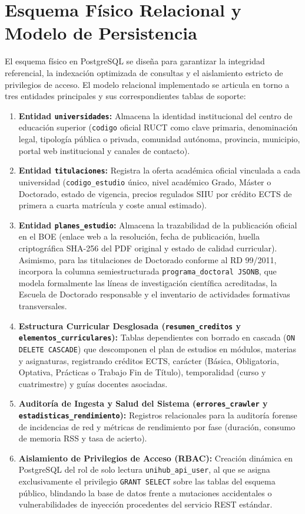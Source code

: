 \section{Esquema Físico Relacional y Modelo de Persistencia}
El esquema físico en PostgreSQL se diseña para garantizar la integridad referencial, la indexación optimizada de consultas y el aislamiento estricto de privilegios de acceso. El modelo relacional implementado se articula en torno a tres entidades principales y sus correspondientes tablas de soporte:
\begin{enumerate}
    \item \textbf{Entidad \texttt{universidades}:} Almacena la identidad institucional del centro de educación superior (\texttt{codigo} oficial RUCT como clave primaria, denominación legal, tipología pública o privada, comunidad autónoma, provincia, municipio, portal web institucional y canales de contacto).
    \item \textbf{Entidad \texttt{titulaciones}:} Registra la oferta académica oficial vinculada a cada universidad (\texttt{codigo\_estudio} único, nivel académico Grado, Máster o Doctorado, estado de vigencia, precios regulados SIIU por crédito ECTS de primera a cuarta matrícula y coste anual estimado).
    \item \textbf{Entidad \texttt{planes\_estudio}:} Almacena la trazabilidad de la publicación oficial en el BOE (enlace web a la resolución, fecha de publicación, huella criptográfica SHA-256 del PDF original y estado de calidad curricular). Asimismo, para las titulaciones de Doctorado conforme al RD 99/2011, incorpora la columna semiestructurada \texttt{programa\_doctoral JSONB}, que modela formalmente las líneas de investigación científica acreditadas, la Escuela de Doctorado responsable y el inventario de actividades formativas transversales.
    \item \textbf{Estructura Curricular Desglosada (\texttt{resumen\_creditos} y \texttt{elementos\_curriculares}):} Tablas dependientes con borrado en cascada (\texttt{ON DELETE CASCADE}) que descomponen el plan de estudios en módulos, materias y asignaturas, registrando créditos ECTS, carácter (Básica, Obligatoria, Optativa, Prácticas o Trabajo Fin de Título), temporalidad (curso y cuatrimestre) y guías docentes asociadas.
    \item \textbf{Auditoría de Ingesta y Salud del Sistema (\texttt{errores\_crawler} y \texttt{estadisticas\_rendimiento}):} Registros relacionales para la auditoría forense de incidencias de red y métricas de rendimiento por fase (duración, consumo de memoria RSS y tasa de acierto).
    \item \textbf{Aislamiento de Privilegios de Acceso (RBAC):} Creación dinámica en PostgreSQL del rol de solo lectura \texttt{unihub\_api\_user}, al que se asigna exclusivamente el privilegio \texttt{GRANT SELECT} sobre las tablas del esquema público, blindando la base de datos frente a mutaciones accidentales o vulnerabilidades de inyección procedentes del servicio REST estándar.
\end{enumerate}

